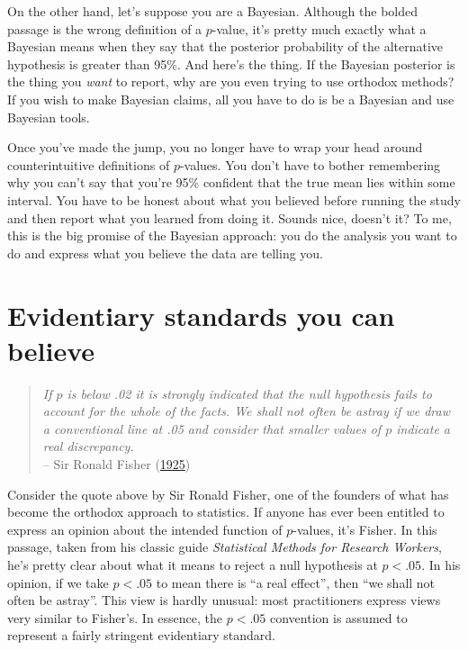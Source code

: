\documentclass[
]{book}
\theoremstyle{definition}
\theoremstyle{definition}
\theoremstyle{definition}
\theoremstyle{definition}
\theoremstyle{remark}
\begin{document}
On the other hand, let's suppose you are a Bayesian. Although the bolded passage is the wrong definition of a \(p\)-value, it's pretty much exactly what a Bayesian means when they say that the posterior probability of the alternative hypothesis is greater than 95\%. And here's the thing. If the Bayesian posterior is the thing you \emph{want} to report, why are you even trying to use orthodox methods? If you wish to make Bayesian claims, all you have to do is be a Bayesian and use Bayesian tools.

Once you've made the jump, you no longer have to wrap your head around counterintuitive definitions of \(p\)-values. You don't have to bother remembering why you can't say that you're 95\% confident that the true mean lies within some interval. You have to be honest about what you believed before running the study and then report what you learned from doing it. Sounds nice, doesn't it? To me, this is the big promise of the Bayesian approach: you do the analysis you want to do and express what you believe the data are telling you.

\hypertarget{evidentiary-standards-you-can-believe}{%
\section{Evidentiary standards you can believe}\label{evidentiary-standards-you-can-believe}}

\begin{quote}
\emph{If \(p\) is below .02 it is strongly indicated that the null hypothesis fails to account for the whole of the facts. We shall not often be astray if we draw a conventional line at .05 and consider that smaller values of \(p\) indicate a real discrepancy.}\\
-- Sir Ronald Fisher (\protect\hyperlink{ref-Fisher1925}{1925})
\end{quote}

Consider the quote above by Sir Ronald Fisher, one of the founders of what has become the orthodox approach to statistics. If anyone has ever been entitled to express an opinion about the intended function of \(p\)-values, it's Fisher. In this passage, taken from his classic guide \emph{Statistical Methods for Research Workers}, he's pretty clear about what it means to reject a null hypothesis at \(p<.05\). In his opinion, if we take \(p<.05\) to mean there is ``a real effect'', then ``we shall not often be astray''. This view is hardly unusual: most practitioners express views very similar to Fisher's. In essence, the \(p<.05\) convention is assumed to represent a fairly stringent evidentiary standard.
\end{document}
